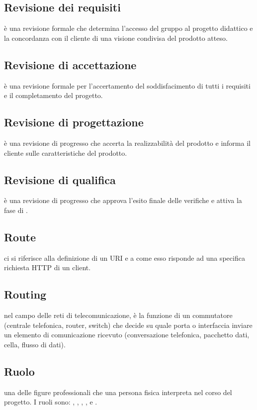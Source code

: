 \documentclass[12pt,a4paper]{article}
\begin{document}
\subsection{Revisione dei requisiti} 
è una revisione formale che determina l'accesso del gruppo al progetto didattico e la concordanza con il cliente di una visione condivisa del prodotto atteso.

\subsection{Revisione di accettazione} 
è una revisione formale per l'accertamento del soddisfacimento di tutti i requisiti e il completamento del progetto.

\subsection{Revisione di progettazione} 
è una revisione di progresso che accerta la realizzabilità del prodotto e informa il cliente sulle caratteristiche del prodotto.

\subsection{Revisione di qualifica} 
è una revisione di progresso che approva l'esito finale delle verifiche e attiva la fase di .

\subsection{Route} 
ci si riferisce alla definizione di un URI e a come esso risponde ad una specifica richiesta HTTP di un client.

\subsection{Routing} 
nel campo delle reti di telecomunicazione, è la funzione di un commutatore (centrale telefonica, router, switch) che decide su quale porta o interfaccia inviare un elemento di comunicazione ricevuto (conversazione telefonica, pacchetto dati, cella, flusso di dati).

\subsection{Ruolo} 
una delle figure professionali che una persona fisica interpreta nel corso del progetto. I ruoli sono: , , , ,  e .
\end{document}
